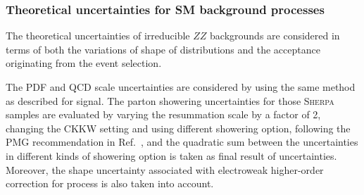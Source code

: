 %
%


\subsubsection{Theoretical uncertainties for SM background processes}

The theoretical uncertainties of irreducible $ZZ$ backgrounds are considered in terms of both the variations of shape of \mfl distributions
and the acceptance originating from the event selection.

The PDF and QCD scale uncertainties are considered by using the same method as described for signal.
The parton showering uncertainties for those \textsc{Sherpa} samples are evaluated by varying the resummation scale by a factor of 2, 
changing the CKKW setting and using different showering option, following the PMG recommendation in Ref.~\cite{twiki_pmgsyst},
and the quadratic sum between the uncertainties in different kinds of showering option is taken as final result of uncertainties.
Moreover, the shape uncertainty associated with electroweak higher-order correction for \qqZZ process is also taken into account.

